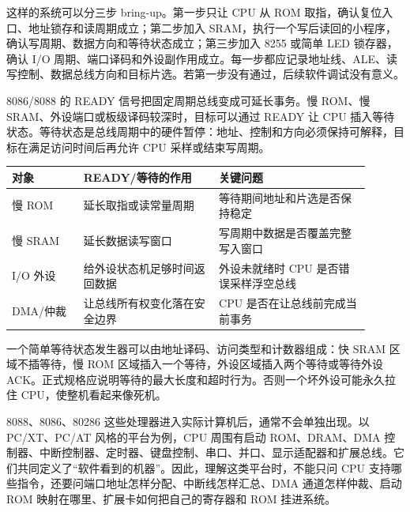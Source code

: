 这样的系统可以分三步 bring-up。第一步只让 CPU 从 ROM 取指，确认复位入口、地址锁存和读周期成立；第二步加入 SRAM，执行一个写后读回的小程序，确认写周期、数据方向和等待状态成立；第三步加入 8255 或简单 LED 锁存器，确认 I/O 周期、端口译码和外设副作用成立。每一步都应记录地址线、ALE、读写控制、数据总线方向和目标片选。若第一步没有通过，后续软件调试没有意义。

8086/8088 的 READY 信号把固定周期总线变成可延长事务。慢 ROM、慢 SRAM、外设端口或板级译码较深时，目标可以通过 READY 让 CPU 插入等待状态。等待状态是总线周期中的硬件暂停：地址、控制和方向必须保持可解释，目标在满足访问时间后再允许 CPU 采样或结束写周期。

\begin{longtable}{L{0.18\linewidth}L{0.34\linewidth}L{0.38\linewidth}}
\toprule
对象 & READY/等待的作用 & 关键问题 \\
\midrule
慢 ROM & 延长取指或读常量周期 & 等待期间地址和片选是否保持稳定 \\\tablerowrule
慢 SRAM & 延长数据读写窗口 & 写周期中数据是否覆盖完整写入窗口 \\\tablerowrule
I/O 外设 & 给外设状态机足够时间返回数据 & 外设未就绪时 CPU 是否错误采样浮空总线 \\\tablerowrule
DMA/仲裁 & 让总线所有权变化落在安全边界 & CPU 是否在让总线前完成当前事务 \\
\bottomrule
\end{longtable}

一个简单等待状态发生器可以由地址译码、访问类型和计数器组成：快 SRAM 区域不插等待，慢 ROM 区域插入一个等待，外设区域插入两个等待或等待外设 ACK。正式规格应说明等待的最大长度和超时行为。否则一个坏外设可能永久拉住 CPU，使整机看起来像死机。

8088、8086、80286 这些处理器进入实际计算机后，通常不会单独出现。以 PC/XT、PC/AT 风格的平台为例，CPU 周围有启动 ROM、DRAM、DMA 控制器、中断控制器、定时器、键盘控制、串口、并口、显示适配器和扩展总线。它们共同定义了“软件看到的机器”。因此，理解这类平台时，不能只问 CPU 支持哪些指令，还要问端口地址怎样分配、中断线怎样汇总、DMA 通道怎样仲裁、启动 ROM 映射在哪里、扩展卡如何把自己的寄存器和 ROM 挂进系统。

